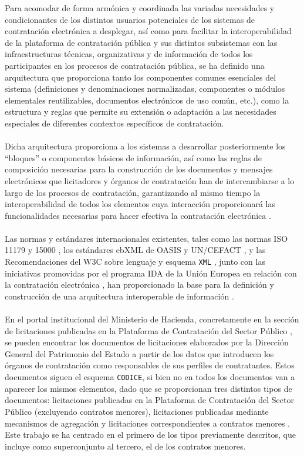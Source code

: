             \noindent Para acomodar de forma armónica y coordinada las variadas necesidades y condicionantes de los distintos usuarios potenciales de los sistemas de contratación electrónica a desplegar, así como para facilitar la interoperabilidad de la plataforma de contratación pública y sus distintos subsistemas con las infraestructuras técnicas, organizativas y de información de todos los participantes en los procesos de contratación pública, se ha definido una arquitectura \cite{CODICEIMPL} que proporciona tanto los componentes comunes esenciales del sistema (definiciones y denominaciones normalizadas, componentes o módulos elementales reutilizables, documentos electrónicos de uso común, etc.), como la estructura y reglas que permite su extensión o adaptación a las necesidades especiales de diferentes contextos específicos de contratación.
            \\ \\
            Dicha arquitectura proporciona a los sistemas a desarrollar posteriormente los “bloques” o componentes básicos de información, así como las reglas de composición necesarias para la construcción de los documentos y mensajes electrónicos que licitadores y órganos de contratación han de intercambiarse a lo largo de los procesos de contratación, garantizando al mismo tiempo la interoperabilidad de todos los elementos cuya interacción proporcionará las funcionalidades necesarias para hacer efectiva la contratación electrónica \cite{CODICEFORM}.
            \\ \\
            Las normas y estándares internacionales existentes, tales como las normas ISO 11179 \cite{ISOMDR} y 15000 \cite{ISOEBXML}, los estándares ebXML de OASIS \cite{EBXML} y UN/CEFACT \cite{UNCEFACT}, y las Recomendaciones del W3C sobre lenguaje y esquema \texttt{XML} \cite{XML}, junto con las iniciativas promovidas por el programa IDA de la Unión Europea en relación con la contratación electrónica \cite{UEIDA}, han proporcionado la base para la definición y construcción de una arquitectura interoperable de información \cite{CODICE}.
            \\ \\
            En el portal institucional del Ministerio de Hacienda, concretamente en la sección de licitaciones publicadas en la Plataforma de Contratación del Sector Público \cite{PORTALHAC}, se pueden encontrar los documentos de licitaciones elaborados por la Dirección General del Patrimonio del Estado a partir de los datos que introducen los órganos de contratación como responsables de sus perfiles de contratantes. Estos documentos siguen el esquema \texttt{CODICE}, si bien no en todos los documentos van a aparecer los mismos elementos, dado que se proporcionan tres distintos tipos de documentos: licitaciones publicadas en la Plataforma de Contratación del Sector Público (excluyendo contratos menores), licitaciones publicadas mediante mecanismos de agregación y licitaciones correspondientes a contratos menores \cite{CODICETIPOS}. Este trabajo se ha centrado en el primero de los tipos previamente descritos, que incluye como superconjunto al tercero, el de los contratos menores.
            
